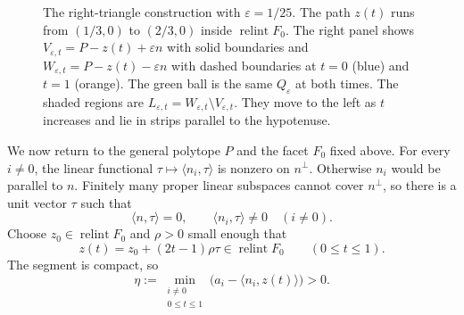 \documentclass[10pt,a4paper]{amsart}
\newcommand\inpro[2]{\langle #1,#2\rangle}
\newcommand\1{\mathbbm{1}}
\newcommand{\eps}{\varepsilon}
\begin{document}
\begin{figure}[H]
    \caption{The right-triangle construction with $\eps=1/25$.
    The path $z(t)$ runs from $(1/3,0)$ to $(2/3,0)$ inside
    $\operatorname{relint}F_0$. The right panel shows
    $V_{\eps,t}=P-z(t)+\eps n$ with solid boundaries and
    $W_{\eps,t}=P-z(t)-\eps n$ with dashed boundaries at $t=0$ (blue)
    and $t=1$ (orange). The green ball is the same $Q_\eps$ at both times.
    The shaded regions are $L_{\eps,t}=W_{\eps,t}\setminus V_{\eps,t}$.
    They move to the left as $t$ increases and lie in strips parallel
    to the hypotenuse.}
    \label{fig:triangle-windows}
\end{figure}

We now return to the general polytope $P$ and the facet $F_0$ fixed above.
For every $i\ne0$, the linear functional
$\tau\mapsto\inpro{n_i}{\tau}$ is nonzero on $n^\perp$.
Otherwise $n_i$ would be parallel to $n$. Finitely many proper linear
subspaces cannot cover $n^\perp$, so there is a unit vector $\tau$ such that
\begin{equation*}
    \inpro{n}{\tau}=0,\qquad
    \inpro{n_i}{\tau}\ne0\quad(i\ne0).
\end{equation*}
Choose $z_0\in\operatorname{relint}F_0$ and $\rho>0$ small enough that
\begin{equation*}
    z(t)=z_0+(2t-1)\rho\tau\in\operatorname{relint}F_0
    \qquad(0\le t\le1).
\end{equation*}
The segment is compact, so
\begin{equation}\label{eq:geom-facet-margin}
    \eta:=\min_{\substack{i\ne0\\0\le t\le1}}
       \bigl(a_i-\inpro{n_i}{z(t)}\bigr)>0.
\end{equation}
\end{document}
